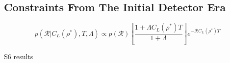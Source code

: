 \documentclass[a0,landscape]{a0poster}
\newcommand{\cbcrate}{{{\mathcal R}}}
\newcommand{\rhostar}{{\rho^*}}
\begin{document}
\begin{multicols}{4}
\section*{\centering Constraints From The Initial Detector Era}

\begin{equation}\label{eq:loudestEventPosterior}
p(\cbcrate | C_L({\rhostar}), T, \Lambda) \propto p(\cbcrate) \left[ \frac{1+\Lambda
C_L(\rhostar) T}{1+\Lambda}\right] e^{-\cbcrate C_L(\rhostar) T}
\end{equation}




  \begin{minipage}{\columnwidth}
    \makeatletter
    \newcommand{\@captype}{figure}
    \makeatother
    \centering
    \qquad%
    \caption{S6 results}
  \end{minipage}


\end{multicols}
\end{document}
